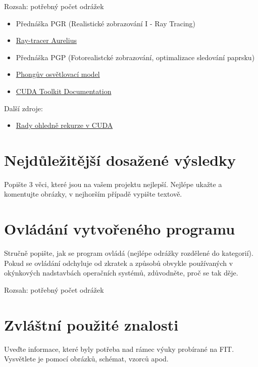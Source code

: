 \documentclass[11pt,a4paper]{article}
\begin{document}
Rozsah: potřebný počet odrážek
\begin{itemize}
\item Přednáška PGR (Realistické zobrazování I - Ray Tracing)
\item \href{https://www.fit.vutbr.cz/study/courses/PGR/private/Aurelius.zip}{Ray-tracer Aurelius}
\item Přednáška PGP (Fotorealistcké zobrazování, optimalizace sledování paprsku)
\item \href{http://cs.wikipedia.org/wiki/Phong%C5%AFv_osv%C4%9Btlovac%C3%AD_model}{Phongův osvětlovací model}
\item \href{http://docs.nvidia.com/cuda}{CUDA Toolkit Documentation}
\end{itemize}
Další zdroje:
\begin{itemize}
\item \href{http://stackoverflow.com/questions/19013156/how-does-cuda-4-0-support-recursion}{Rady ohledně rekurze v CUDA}
\end{itemize}
\section{Nejdůležitější dosažené výsledky}

Popište 3 věci, které jsou na vašem projektu nejlepší. Nejlépe ukažte a
komentujte obrázky, v nejhorším případě vypište textově.

\section{Ovládání vytvořeného programu}

Stručně popište, jak se program ovládá (nejlépe odrážky rozdělené do
kategorií). Pokud se ovládání odchyluje od zkratek a způsobů obvykle
používaných v okýnkových nadstavbách operačních systémů, zdůvodněte, proč se
tak děje.

Rozsah: potřebný počet odrážek

\section{Zvláštní použité znalosti}

Uveďte informace, které byly potřeba nad rámec výuky probírané na FIT.
Vysvětlete je pomocí obrázků, schémat, vzorců apod. 
\end{document}
